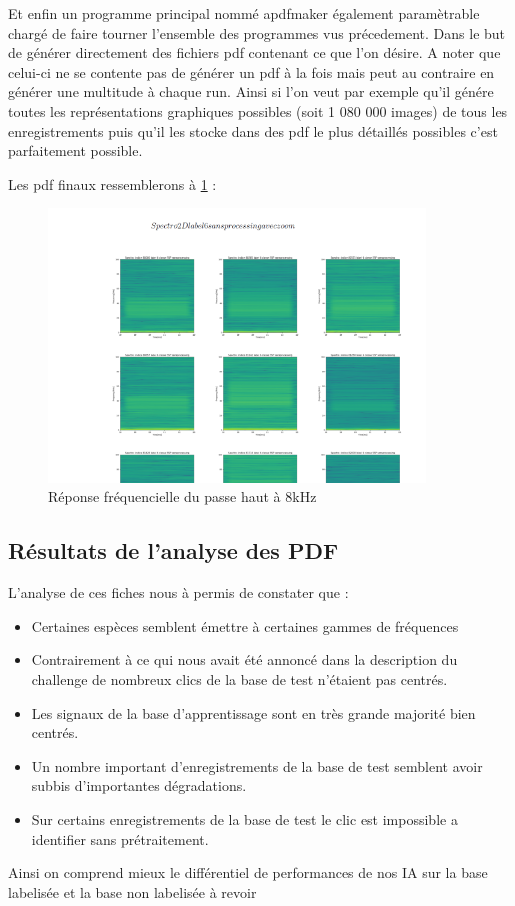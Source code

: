 Et enfin un programme principal nommé apdfmaker également paramètrable chargé de faire tourner l'ensemble des programmes vus précedement. Dans le but de générer directement des fichiers pdf contenant ce que l'on désire. A noter que celui-ci ne se contente pas de générer un pdf à la fois mais peut au contraire en générer une multitude à chaque run. Ainsi si l'on veut par exemple qu'il génére toutes les représentations graphiques possibles (soit 1 080 000 images) de tous les enregistrements puis qu'il les stocke dans des pdf le plus détaillés possibles c'est parfaitement possible.

Les pdf finaux ressemblerons à \ref{fig:exempledepdf} :

\begin{figure}[!h]
\centering
\includegraphics[width=10cm]{./images/pdfexemple.png}
\caption{Réponse fréquencielle du passe haut à 8kHz%
\label{fig:exempledepdf}}
\end{figure}


\hypertarget{Ruxe9sultats-de-l-analyse-des-PDF}{%
\subsection{Résultats de l'analyse des PDF}
\label{Ruxe9sultats-de-l-analyse-des-PDF}}

L'analyse de ces fiches nous à permis de constater que :
\begin{itemize}
\item Certaines espèces semblent émettre à certaines gammes de fréquences
\item Contrairement à ce qui nous avait été annoncé dans la description du challenge de nombreux clics de la base de test n'étaient pas centrés.
\item Les signaux de la base d'apprentissage sont en très grande majorité bien centrés.
\item Un nombre important d'enregistrements de la base de test semblent avoir subbis d'importantes dégradations.
\item Sur certains enregistrements de la base de test le clic est impossible a identifier sans prétraitement.
\end{itemize}
Ainsi on comprend mieux le différentiel de performances de nos IA sur la base labelisée et la base non labelisée
\coment à revoir

